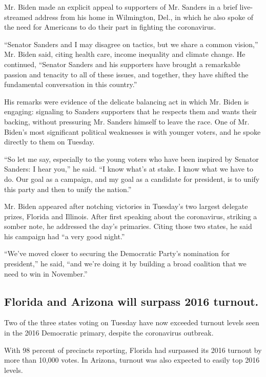 Mr. Biden made an explicit appeal to supporters of Mr. Sanders in a
brief live-streamed address from his home in Wilmington, Del., in which
he also spoke of the need for Americans to do their part in fighting the
coronavirus.

``Senator Sanders and I may disagree on tactics, but we share a common
vision,'' Mr. Biden said, citing health care, income inequality and
climate change. He continued, ``Senator Sanders and his supporters have
brought a remarkable passion and tenacity to all of these issues, and
together, they have shifted the fundamental conversation in this
country.''

His remarks were evidence of the delicate balancing act in which Mr.
Biden is engaging: signaling to Sanders supporters that he respects them
and wants their backing, without pressuring Mr. Sanders himself to leave
the race. One of Mr. Biden's most significant political weaknesses is
with younger voters, and he spoke directly to them on Tuesday.

``So let me say, especially to the young voters who have been inspired
by Senator Sanders: I hear you,'' he said. ``I know what's at stake. I
know what we have to do. Our goal as a campaign, and my goal as a
candidate for president, is to unify this party and then to unify the
nation.''

Mr. Biden appeared after notching victories in Tuesday's two largest
delegate prizes, Florida and Illinois. After first speaking about the
coronavirus, striking a somber note, he addressed the day's primaries.
Citing those two states, he said his campaign had ``a very good night.''

``We've moved closer to securing the Democratic Party's nomination for
president,'' he said, ``and we're doing it by building a broad coalition
that we need to win in November.''

\hypertarget{florida-and-arizona-will-surpass-2016-turnout}{%
\subsection{Florida and Arizona will surpass 2016
turnout.}\label{florida-and-arizona-will-surpass-2016-turnout}}

Two of the three states voting on Tuesday have now exceeded turnout
levels seen in the 2016 Democratic primary, despite the coronavirus
outbreak.

With 98 percent of precincts reporting, Florida had surpassed its 2016
turnout by more than 10,000 votes. In Arizona, turnout was also expected
to easily top 2016 levels.

